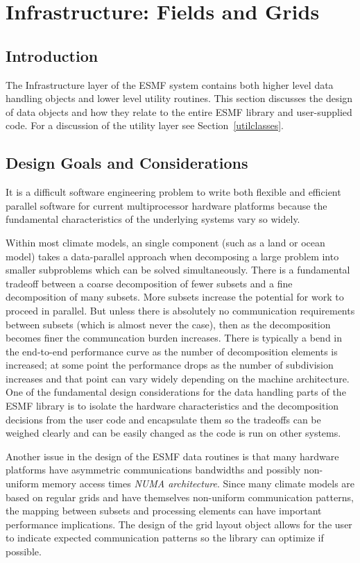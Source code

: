 \section{Infrastructure: Fields and Grids}
\label{sec:fieldclasses}

\subsection{Introduction}

The Infrastructure layer of the ESMF system contains both 
higher level data handling objects and lower level utility routines.
This section discusses the design of data objects and how they relate 
to the entire ESMF library and user-supplied code.  
For a discussion of the utility layer see Section~\ref{utilclasses}.


\subsection{Design Goals and Considerations}

It is a difficult software engineering problem
to write both flexible and efficient parallel 
software for current multiprocessor hardware platforms
because the fundamental characteristics of the underlying
systems vary so widely.

Within most climate models, an single component (such as a
land or ocean model) takes a data-parallel approach when 
decomposing a large problem into smaller subproblems which can be 
solved simultaneously.
There is a fundamental tradeoff between a coarse decomposition
of fewer subsets and a fine decomposition of many subsets.
More subsets increase the potential for
work to proceed in parallel.  But unless there is absolutely
no communication requirements between subsets (which is
almost never the case), then as the
decomposition becomes finer the communcation burden increases.
There is typically a bend in the end-to-end performance
curve as the number of decomposition elements is increased;
at some point the performance drops as the number of subdivision
increases and that point can vary widely 
depending on the machine architecture. 
One of the fundamental design considerations for the data
handling parts of the ESMF library is to isolate the hardware
characteristics and the decomposition decisions from the
user code and encapsulate them so the tradeoffs can be 
weighed clearly and can be easily changed as the code is 
run on other systems.

Another issue in the design of the ESMF data routines is that
many hardware platforms have asymmetric
communications bandwidths and possibly non-uniform memory
access times {\it NUMA architecture}.
Since many climate models are based on regular grids and
have themselves non-uniform communication patterns, the
mapping between subsets and processing elements can have
important performance implications.  The design of the
grid layout object allows for the user to indicate expected
communication patterns so the library can optimize if possible.

